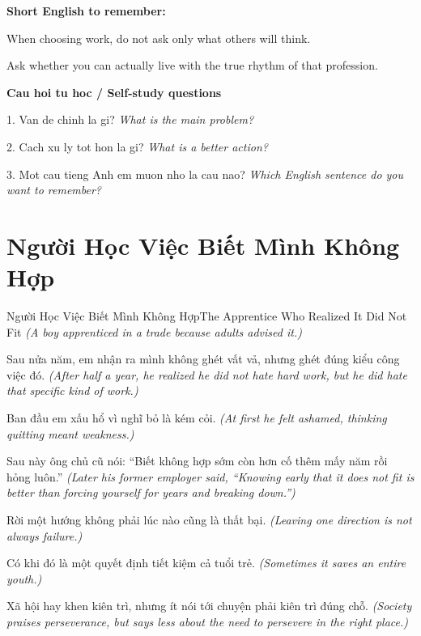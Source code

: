 \begin{ghinhoanh}
\textbf{Short English to remember:}

When choosing work, do not ask only what others will think.

Ask whether you can actually live with the true rhythm of that profession.

\end{ghinhoanh}

\begin{tuhocnhanh}
\textbf{Cau hoi tu hoc / Self-study questions}

1. Van de chinh la gi? \textit{What is the main problem?}

2. Cach xu ly tot hon la gi? \textit{What is a better action?}

3. Mot cau tieng Anh em muon nho la cau nao? \textit{Which English sentence do you want to remember?}
\end{tuhocnhanh}
\ngancach

\section{Người Học Việc Biết Mình Không Hợp}
\begin{truyen}{Người Học Việc Biết Mình Không Hợp}{The Apprentice Who Realized It Did Not Fit}
\textit{(A boy apprenticed in a trade because adults advised it.)}

Sau nửa năm, em nhận ra mình không ghét vất vả, nhưng ghét đúng kiểu công việc đó.
\textit{(After half a year, he realized he did not hate hard work, but he did hate that specific kind of work.)}

Ban đầu em xấu hổ vì nghĩ bỏ là kém cỏi.
\textit{(At first he felt ashamed, thinking quitting meant weakness.)}

Sau này ông chủ cũ nói: ``Biết không hợp sớm còn hơn cố thêm mấy năm rồi hỏng luôn.''
\textit{(Later his former employer said, ``Knowing early that it does not fit is better than forcing yourself for years and breaking down.'')}

Rời một hướng không phải lúc nào cũng là thất bại.
\textit{(Leaving one direction is not always failure.)}

Có khi đó là một quyết định tiết kiệm cả tuổi trẻ.
\textit{(Sometimes it saves an entire youth.)}

Xã hội hay khen kiên trì, nhưng ít nói tới chuyện phải kiên trì đúng chỗ.
\textit{(Society praises perseverance, but says less about the need to persevere in the right place.)}

\end{truyen}

